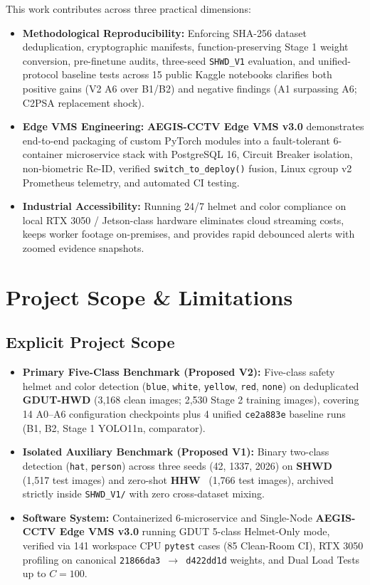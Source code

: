 This work contributes across three practical dimensions:
\begin{itemize}[leftmargin=1.8em, itemsep=2.5pt]
  \item \textbf{Methodological Reproducibility:} Enforcing SHA-256 dataset deduplication, cryptographic manifests, function-preserving Stage 1 weight conversion, pre-finetune audits, three-seed \texttt{SHWD\_V1} evaluation, and unified-protocol baseline tests across 15 public Kaggle notebooks clarifies both positive gains (V2 A6 over B1/B2) and negative findings (A1 surpassing A6; C2PSA replacement shock).
  \item \textbf{Edge VMS Engineering:} \textbf{AEGIS-CCTV Edge VMS v3.0} demonstrates end-to-end packaging of custom PyTorch modules into a fault-tolerant 6-container microservice stack with PostgreSQL 16, Circuit Breaker isolation, non-biometric Re-ID, verified \nolinkurl{switch_to_deploy()} fusion, Linux cgroup v2 Prometheus telemetry, and automated CI testing.
  \item \textbf{Industrial Accessibility:} Running 24/7 helmet and color compliance on local RTX 3050 / Jetson-class hardware eliminates cloud streaming costs, keeps worker footage on-premises, and provides rapid debounced alerts with zoomed evidence snapshots.
\end{itemize}

\section{Project Scope \& Limitations}

\subsection{Explicit Project Scope}

\begin{itemize}[leftmargin=1.8em, itemsep=2pt]
  \item \textbf{Primary Five-Class Benchmark (\textbf{Proposed V2}):} Five-class safety helmet and color detection (\texttt{blue}, \texttt{white}, \texttt{yellow}, \texttt{red}, \texttt{none}) on deduplicated \textbf{GDUT-HWD} (3,168 clean images; 2,530 Stage 2 training images), covering 14 A0--A6 configuration checkpoints plus 4 unified \texttt{ce2a883e} baseline runs (B1, B2, Stage 1 YOLO11n, comparator).
  \item \textbf{Isolated Auxiliary Benchmark (\textbf{Proposed V1}):} Binary two-class detection (\texttt{hat}, \texttt{person}) across three seeds (42, 1337, 2026) on \textbf{SHWD}~\cite{shwd_dataset} (1,517 test images) and zero-shot \textbf{HHW}~\cite{hard_hat_workers_mvd} (1,766 test images), archived strictly inside \texttt{SHWD\_V1/} with zero cross-dataset mixing.
  \item \textbf{Software System:} Containerized 6-microservice and Single-Node \textbf{AEGIS-CCTV Edge VMS v3.0} running GDUT 5-class Helmet-Only mode, verified via 141 workspace CPU \texttt{pytest} cases (85 Clean-Room CI), RTX 3050 profiling on canonical \texttt{21866da3 $\to$ d422dd1d} weights, and Dual Load Tests up to $C=100$.
\end{itemize}

